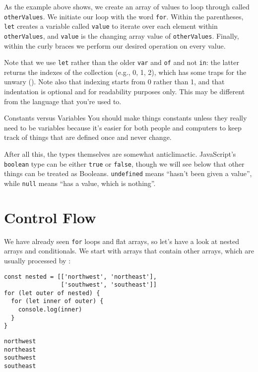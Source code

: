 \noindent
As the example above shows, we create an array of values to loop through called \texttt{otherValues}.
We initiate our loop with the word \texttt{for}.
Within the parentheses, \texttt{let} creates a variable called \texttt{value} to iterate over each element within \texttt{otherValues},
and \texttt{value} is the changing array value of \texttt{otherValues}.
Finally, within the curly braces we perform our desired operation on every value.

Note that we use \texttt{let} rather than the older \texttt{var} and \texttt{of} and not \texttt{in}:
the latter returns the indexes of the collection (e.g., 0, 1, 2),
which has some traps for the unwary ().
Note also that indexing starts from 0 rather than 1,
and that indentation is optional and for readability purposes only.
This may be different from the language that you're used to.

\begin{aside}{Constants versus Variables}
  You should make things constants unless they really need to be variables
  because it's easier for both people and computers to keep track of things
  that are defined once and never change.
\end{aside}

After all this,
the types themselves are somewhat anticlimactic.
JavaScript's \texttt{boolean} type can be either \texttt{true} or \texttt{false},
though we will see below that other things can be treated as Booleans.
\texttt{undefined} means ``hasn't been given a value'',
while \texttt{null} means ``has a value, which is nothing''.

\section{Control Flow}\label{s:basics-control-flow}

We have already seen \texttt{for} loops and flat arrays,
so let's have a look at nested arrays and conditionals.
We start with arrays that contain other arrays,
which are usually processed by :

\begin{verbatim}
const nested = [['northwest', 'northeast'],
                ['southwest', 'southeast']]
for (let outer of nested) {
  for (let inner of outer) {
    console.log(inner)
  }
}
\end{verbatim}

\begin{verbatim}
northwest
northeast
southwest
southeast
\end{verbatim}

